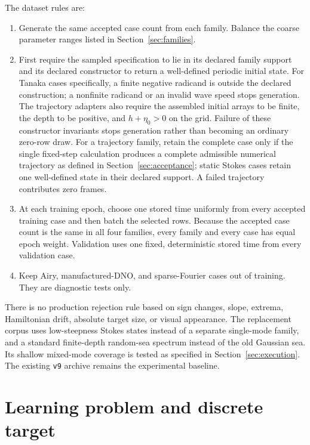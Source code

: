\documentclass[11pt]{article}
\begin{document}
The dataset rules are:
\begin{enumerate}
  \item Generate the same accepted case count from each family.  Balance
        the coarse parameter ranges listed in Section~\ref{sec:families}.
  \item First require the sampled specification to lie in its declared
        family support and its declared constructor to return a well-defined
        periodic initial state.  For Tanaka cases specifically, a finite
        negative radicand is outside the declared construction; a nonfinite
        radicand or an invalid wave speed stops generation.  The trajectory
        adapters also require the assembled initial arrays to be finite, the
        depth to be positive, and \(h+\eta_0>0\) on the grid.  Failure of
        these constructor invariants stops generation rather than becoming
        an ordinary zero-row draw.  For a trajectory
        family, retain the complete case only if the single fixed-step
        calculation produces a complete admissible numerical trajectory as
        defined in Section~\ref{sec:acceptance}; static Stokes cases retain
        one well-defined state in their declared support.  A failed
        trajectory contributes zero frames.
  \item At each training epoch, choose one stored time uniformly from every
        accepted training case and then batch the selected rows.  Because the
        accepted case count is the same in all four families, every family and
        every case has equal epoch weight.  Validation uses one fixed,
        deterministic stored time from every validation case.
  \item Keep Airy, manufactured-DNO, and sparse-Fourier cases out of training.
        They are diagnostic tests only.
\end{enumerate}
There is no production rejection rule based on sign changes, slope, extrema,
Hamiltonian drift, absolute target size, or visual appearance.
The replacement corpus uses low-steepness Stokes states instead of a separate
single-mode family, and a standard finite-depth random-sea spectrum instead
of the old Gaussian sea.  Its shallow mixed-mode coverage is tested as
specified in Section~\ref{sec:execution}.  The existing \texttt{v9} archive
remains the experimental baseline.

\section{Learning problem and discrete target}
\label{sec:target}
\end{document}
